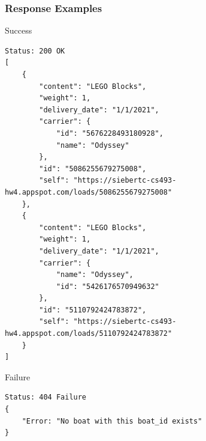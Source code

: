 \documentclass[letterpaper,11pt,titlepage,draftclsnofoot,onecolumn,compsoc,utf8,latin1]{IEEEtran}
\begin{document}
\begin{singlespace}
\subsubsection{Response Examples}

\noindent \Large{Success}

\begin{lstlisting}[]
Status: 200 OK
[
    {
        "content": "LEGO Blocks",
        "weight": 1,
        "delivery_date": "1/1/2021",
        "carrier": {
            "id": "5676228493180928",
            "name": "Odyssey"
        },
        "id": "5086255679275008",
        "self": "https://siebertc-cs493-hw4.appspot.com/loads/5086255679275008"
    },
    {
        "content": "LEGO Blocks",
        "weight": 1,
        "delivery_date": "1/1/2021",
        "carrier": {
            "name": "Odyssey",
            "id": "5426176570949632"
        },
        "id": "5110792424783872",
        "self": "https://siebertc-cs493-hw4.appspot.com/loads/5110792424783872"
    }
]
\end{lstlisting}

\noindent \Large{Failure}

\begin{lstlisting}[]
Status: 404 Failure
{
    "Error: "No boat with this boat_id exists"
}
\end{lstlisting}

\newpage 

\end{singlespace}
\end{document}
